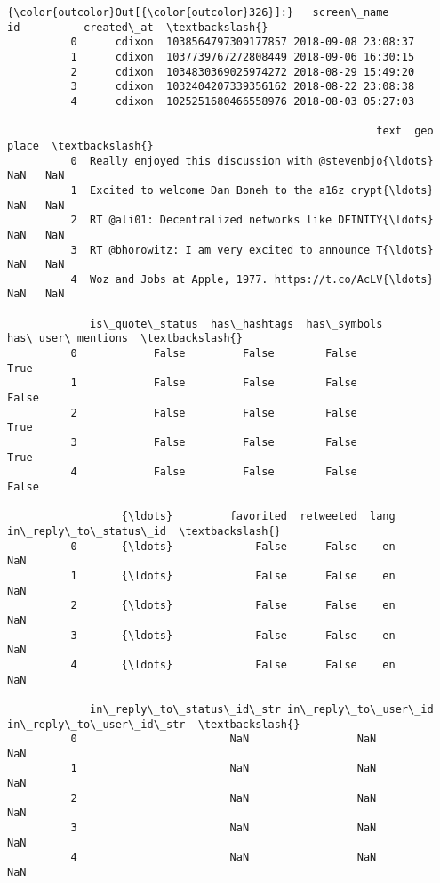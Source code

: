 \documentclass[11pt]{article}
\begin{document}
\begin{Verbatim}[commandchars=\\\{\}]
{\color{outcolor}Out[{\color{outcolor}326}]:}   screen\_name                   id          created\_at  \textbackslash{}
          0      cdixon  1038564797309177857 2018-09-08 23:08:37   
          1      cdixon  1037739767272808449 2018-09-06 16:30:15   
          2      cdixon  1034830369025974272 2018-08-29 15:49:20   
          3      cdixon  1032404207339356162 2018-08-22 23:08:38   
          4      cdixon  1025251680466558976 2018-08-03 05:27:03   
          
                                                          text  geo place  \textbackslash{}
          0  Really enjoyed this discussion with @stevenbjo{\ldots}  NaN   NaN   
          1  Excited to welcome Dan Boneh to the a16z crypt{\ldots}  NaN   NaN   
          2  RT @ali01: Decentralized networks like DFINITY{\ldots}  NaN   NaN   
          3  RT @bhorowitz: I am very excited to announce T{\ldots}  NaN   NaN   
          4  Woz and Jobs at Apple, 1977. https://t.co/AcLV{\ldots}  NaN   NaN   
          
             is\_quote\_status  has\_hashtags  has\_symbols  has\_user\_mentions  \textbackslash{}
          0            False         False        False               True   
          1            False         False        False              False   
          2            False         False        False               True   
          3            False         False        False               True   
          4            False         False        False              False   
          
                  {\ldots}         favorited  retweeted  lang  in\_reply\_to\_status\_id  \textbackslash{}
          0       {\ldots}             False      False    en                    NaN   
          1       {\ldots}             False      False    en                    NaN   
          2       {\ldots}             False      False    en                    NaN   
          3       {\ldots}             False      False    en                    NaN   
          4       {\ldots}             False      False    en                    NaN   
          
             in\_reply\_to\_status\_id\_str in\_reply\_to\_user\_id  in\_reply\_to\_user\_id\_str  \textbackslash{}
          0                        NaN                 NaN                      NaN   
          1                        NaN                 NaN                      NaN   
          2                        NaN                 NaN                      NaN   
          3                        NaN                 NaN                      NaN   
          4                        NaN                 NaN                      NaN   
          

\end{Verbatim}
\end{document}

